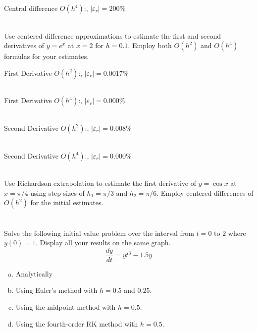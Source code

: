 \documentclass{article}
\begin{document}
\begin{solution}
Central difference $O(h^{4})$:, $|\varepsilon_{r}| = \boxed{200\%}$\\\\
\end{solution}

\begin{problem}
Use centered difference approximations to estimate the first and second derivatives of $y=e^{x}$ at $x=2$ for $h=0.1$. Employ both $O(h^{2})$ and $O(h^{4})$ formulas for your estimates.
\end{problem}

\begin{solution}
First Derivative $O(h^{2})$:, $|\varepsilon_{r}| = \boxed{0.0017\%}$\\\\
\end{solution}

\begin{solution}
First Derivative $O(h^{4})$:, $|\varepsilon_{r}| = \boxed{0.000\%}$\\\\
\end{solution}

\begin{solution}
Second Derivative $O(h^{2})$:, $|\varepsilon_{r}| = \boxed{0.008\%}$\\\\
\end{solution}

\begin{solution}
Second Derivative $O(h^{4})$:, $|\varepsilon_{r}| = \boxed{0.000\%}$\\\\
\end{solution}

\setcounter{problem}{3}
\begin{problem}
Use Richardson extrapolation to estimate the first derivative of $y=\cos x$ at $x=\pi/4$ using step sizes of $h_{1}=\pi/3$ and $h_{2}=\pi/6$. Employ centered differences of $O(h^{2})$ for the initial estimates.
\end{problem}

\section{}
\begin{problem}
Solve the following initial value problem over the interval from $t=0$ to $2$ where $y(0)=1$. Display all your results on the same graph.
\[ \frac{dy}{dt} = yt^{3} -1.5y \]
\begin{enumerate}[(a)]
\item Analytically
\item Using Euler's method with $h=0.5$ and $0.25$.
\item Using the midpoint method with $h=0.5$.
\item Using the fourth-order RK method with $h=0.5$.
\end{enumerate}
\end{problem}
\end{document}
